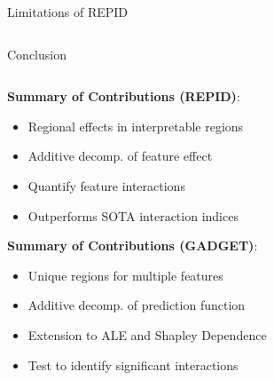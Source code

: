 \documentclass[10pt,compress,t,notes=noshow, xcolor=table]{beamer}
\begin{document}
\begin{frame}{Limitations of REPID}
\begin{columns}[T, totalwidth = \textwidth]
\end{columns}
\bigskip
\end{frame}


\begin{frame}{Conclusion}

\begin{columns}[T, totalwidth = \textwidth]
    \begin{column}{0.58\textwidth}

 \textbf{Summary of Contributions (REPID)}:
 \begin{itemize}
    \item Regional effects in interpretable regions
    \item Additive decomp. of feature effect 
    \item Quantify feature interactions 
    \item Outperforms SOTA interaction indices
\end{itemize}

 \textbf{Summary of Contributions (GADGET)}:
 \begin{itemize}
 \item Unique regions for multiple features
 \item Additive decomp. of prediction function%
 \item Extension to ALE and Shapley Dependence
 \item Test to identify significant interactions
\end{itemize}


\end{column}
\end{columns}
\end{frame}
\end{document}
